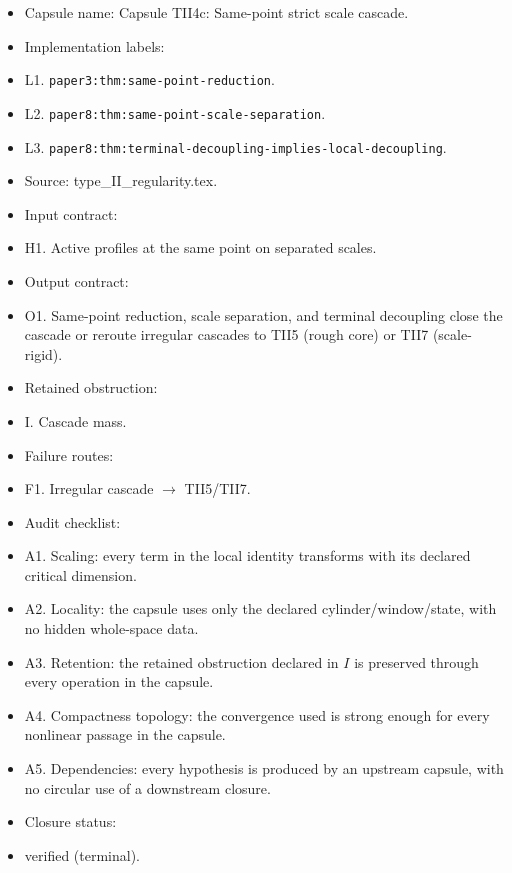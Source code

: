 \documentclass[11pt]{amsart}
\begin{document}
\begin{itemize}
  \item Capsule name: Capsule TII4c: Same-point strict scale cascade.
  \item Implementation labels:
  \item L1. \texttt{paper3:thm:same-point-reduction}.
  \item L2. \texttt{paper8:thm:same-point-scale-separation}.
  \item L3. \texttt{paper8:thm:terminal-decoupling-implies-local-decoupling}.
  \item Source: type\_II\_regularity.tex.
  \item Input contract:
  \item H1. Active profiles at the same point on separated scales.
  \item Output contract:
  \item O1. Same-point reduction, scale separation, and terminal decoupling close the cascade or reroute irregular cascades to TII5 (rough core) or TII7 (scale-rigid).
  \item Retained obstruction:
  \item I. Cascade mass.
  \item Failure routes:
  \item F1. Irregular cascade $\to$ TII5/TII7.
  \item Audit checklist:
  \item A1. Scaling: every term in the local identity transforms with its declared critical dimension.
  \item A2. Locality: the capsule uses only the declared cylinder/window/state, with no hidden whole-space data.
  \item A3. Retention: the retained obstruction declared in $I$ is preserved through every operation in the capsule.
  \item A4. Compactness topology: the convergence used is strong enough for every nonlinear passage in the capsule.
  \item A5. Dependencies: every hypothesis is produced by an upstream capsule, with no circular use of a downstream closure.
  \item Closure status:
  \item verified (terminal).
\end{itemize}
\end{document}

